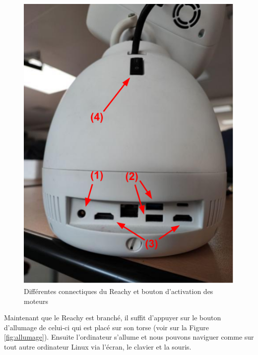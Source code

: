 \documentclass[a4paper,french]{article}
\begin{document}
\begin{figure}[H]
    \centering
    \includegraphics[scale=0.4]{figures/connectique.png}
    \caption{Différentes connectiques du Reachy et bouton d'activation des moteurs}
    \label{fig:connectique}
\end{figure}
  
Maintenant que le Reachy est branché, il suffit d'appuyer sur le bouton d'allumage de celui-ci qui est placé sur son torse (voir sur la Figure \ref{fig:allumage}). Ensuite l'ordinateur s'allume et nous pouvons naviguer comme sur tout autre ordinateur Linux via l'écran, le clavier et la souris.
 
\end{document}
